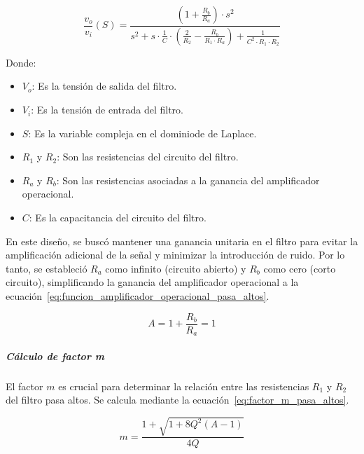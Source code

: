                     \begin{equation}
                        \label{eq:funcion_transferencia_pasa_altos}
                        \frac{v_o}{v_i}(S) = \frac{(1+\frac{R_b}{R_a}) \cdot s^2}{s^2 + s \cdot \frac{1}{C} \cdot (\frac{2}{R_2}- \frac{R_b}{R_1 \cdot R_a}) + \frac{1}{C^2 \cdot R_1 \cdot R_2}}
                    \end{equation}

                    Donde:
                    \begin{itemize}
                        \item $V_o$: Es la tensión de salida del filtro.
                        \item $V_i$: Es la tensión de entrada del filtro.
                        \item $S$: Es la variable compleja en el dominiode de Laplace.
                        \item $R_1$ y $R_2$: Son las resistencias del circuito del filtro.
                        \item $R_a$ y $R_b$: Son las resistencias asociadas a la ganancia del amplificador operacional.
                        \item $C$: Es la capacitancia del circuito del filtro.
                    \end{itemize}

                    En este diseño, se buscó mantener una ganancia unitaria en el filtro para evitar la amplificación adicional de la señal y minimizar la introducción de ruido. Por lo tanto, se estableció $R_a$ como infinito (circuito abierto) y $R_b$ como cero (corto circuito), simplificando la ganancia del amplificador operacional a la ecuación~\ref{eq:funcion_amplificador_operacional_pasa_altos}.

                    \begin{equation}
                        \label{eq:funcion_amplificador_operacional_pasa_altos}
                        A = 1 + \frac{R_b}{R_a} = 1
                    \end{equation}

                \subparagraph{Cálculo de factor m}
                    El factor $m$ es crucial para determinar la relación entre las resistencias $R_1$ y $R_2$ del filtro pasa altos. Se calcula mediante la ecuación~\ref{eq:factor_m_pasa_altos}.

                    \begin{equation}
                        \label{eq:factor_m_pasa_altos}
                        m = \frac{1+\sqrt{1+8Q^2(A-1)}}{4Q}
                    \end{equation}

